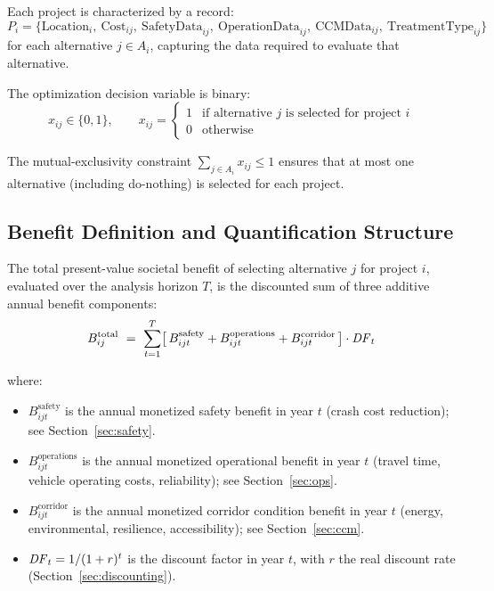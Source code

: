 Each project is characterized by a record:
\begin{equation}
P_i = \{ \mathrm{Location}_i,\ \mathrm{Cost}_{ij},\ \mathrm{SafetyData}_{ij},\
         \mathrm{OperationData}_{ij},\ \mathrm{CCMData}_{ij},\
         \mathrm{TreatmentType}_{ij} \}
\end{equation}
\noindent for each alternative $j \in A_i$, capturing the data required to
evaluate that alternative.

The optimization decision variable is binary:
\begin{equation}
x_{ij} \in \{0, 1\}, \qquad
x_{ij} = \begin{cases}
1 & \text{if alternative } j \text{ is selected for project } i \\
0 & \text{otherwise}
\end{cases}
\end{equation}

The mutual-exclusivity constraint
$\sum_{j \in A_i} x_{ij} \leq 1$ ensures that at most one alternative (including
do-nothing) is selected for each project.

\subsection{Benefit Definition and Quantification Structure}

The total present-value societal benefit of selecting alternative $j$ for
project $i$, evaluated over the analysis horizon $T$, is the discounted sum
of three additive annual benefit components:
\begin{equation}
B^{\mathrm{total}}_{ij}\ =\ \sum_{t=1}^{T}\bigl[\, B_{ijt}^{\mathrm{safety}} + B_{ijt}^{\mathrm{operations}} + B_{ijt}^{\mathrm{corridor}} \,\bigr] \cdot \mathit{DF}_t
\label{eq:btot}
\end{equation}

\noindent where:
\begin{itemize}[leftmargin=2em, itemsep=2pt]
  \item $B_{ijt}^{\mathrm{safety}}$ is the annual monetized safety benefit
    in year $t$ (crash cost reduction); see Section~\ref{sec:safety}.
  \item $B_{ijt}^{\mathrm{operations}}$ is the annual monetized operational
    benefit in year $t$ (travel time, vehicle operating costs, reliability);
    see Section~\ref{sec:ops}.
  \item $B_{ijt}^{\mathrm{corridor}}$ is the annual monetized corridor
    condition benefit in year $t$ (energy, environmental, resilience,
    accessibility); see Section~\ref{sec:ccm}.
  \item $\mathit{DF}_t = 1/(1+r)^t$ is the discount factor in year $t$, with $r$ the
    real discount rate (Section~\ref{sec:discounting}).
\end{itemize}

